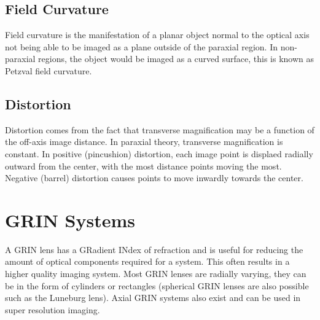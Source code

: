 \documentclass[12pt]{report}
\begin{document}
\subsection{Field Curvature}
Field curvature is the manifestation of a planar object normal to the optical axis not being able to be imaged as a plane outside of the paraxial region. In non-paraxial regions, the object would be imaged as a curved surface, this is known as Petzval field curvature. 

\subsection{Distortion}
Distortion comes from the fact that transverse magnification may be a function of the off-axis image distance. In paraxial theory, transverse magnification is constant. In positive (pincushion) distortion, each image point is displaed radially outward from the center, with the most distance points moving the most. Negative (barrel) distortion causes points to move inwardly towards the center. 

\section{GRIN Systems}
A GRIN lens has a GRadient INdex of refraction and is useful for reducing the amount of optical components required for a system. This often results in a higher quality imaging system. Most GRIN lenses are radially varying, they can be in the form of cylinders or rectangles (spherical GRIN lenses are also possible such as the Luneburg lens). Axial GRIN systems also exist and can be used in super resolution imaging. 
\end{document}
